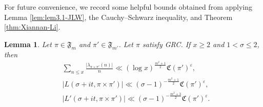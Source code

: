 \documentclass[12pt,reqno]{amsart}
\newtheorem{lem}[thm]{Lemma}
\theoremstyle{remark}
\numberwithin{equation}{section}
\begin{document}
    For future convenience, we record some helpful bounds obtained from applying Lemma \ref{lem:lem3.1-JLW}, the Cauchy--Schwarz inequality, and Theorem \ref{thm:Xiannan-Li}.

    \begin{lem}\label{lem:3.2-Sound}  Let $\pi \in \mathfrak{F}_m$ and $ \pi' \in \mathfrak{F}_{m'}$. Let $\pi$ satisfy GRC. If $x \ge 2$ and $1< \sigma \le 2$, then
		\begin{align}
            &\sum_{n \le x} \frac{|\lambda_{\pi \times \pi'}(n)|}{n}  \ll (\log x)^{\frac{m^2+1}{2}}\mathfrak{C}(\pi')^{\varepsilon},\label{eq:lem3.2-Sound-1}\\
            &|L(\sigma+it, \pi \times \pi')| \ll (\sigma-1)^{-\frac{m^2+1}{2}}\mathfrak{C}(\pi')^{\varepsilon},\label{eq:lem3.2-Sound-2} \\
            &|L'(\sigma+it, \pi \times \pi')| \ll (\sigma-1)^{-\frac{m^2+3}{2}}\mathfrak{C}(\pi')^{\varepsilon}.\label{eq:lem3.2-Sound-3} 
            \end{align}
	\end{lem}
\end{document}
